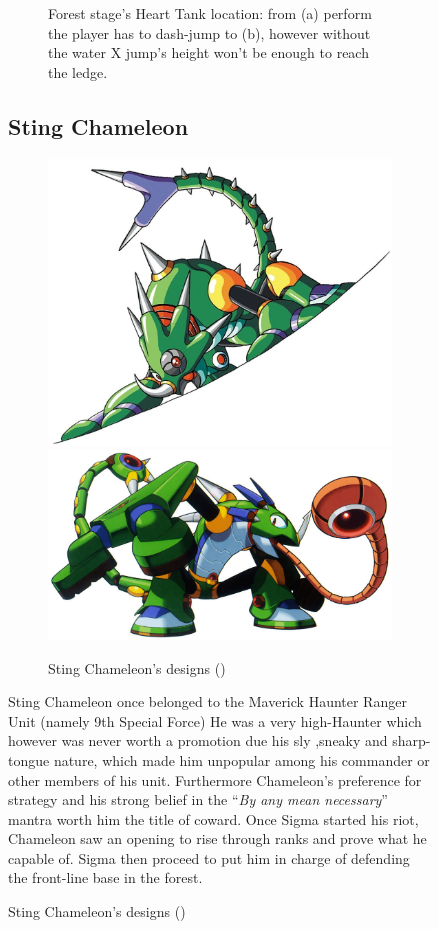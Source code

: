 \begin{figure}[htp]
\begin{figure}[htp]
\begin{subfigure}{0.45\linewidth}
		\caption{}
	\end{subfigure}
	\caption{Forest stage's Heart Tank location: from (a) perform the player has to dash-jump to (b), however without the water X jump's height won't be enough to reach the ledge.}
\end{figure}

\subsection{Sting Chameleon}\label{boss:Sting_chameleon}
\begin{figure}[htp]
	\centering
	\includegraphics[width=0.5\linewidth]{figures/X1/Sting_chameleon/Stingchameleon.jpg}
	\includegraphics[width=0.45\linewidth]{figures/X1/Sting_chameleon/MHXStingChameleon.jpg}
	\caption{Sting Chameleon's designs (\cite{book:MMX_Complete_art})}
\end{figure}
Sting Chameleon once belonged to the Maverick Haunter Ranger Unit (namely 9th Special Force\cite{wayback:X_resources}) He was a very high-Haunter which however was never worth a promotion due his sly ,sneaky and sharp-tongue nature, which made him unpopular\cite{Xcoll1:Manual_X1} among his commander or other members of his unit. Furthermore Chameleon's preference for strategy and his strong belief in the ``\textit{By any mean necessary}'' mantra  worth him the title of coward\cite{MHX:manual}. Once Sigma started his riot, Chameleon saw an opening to rise through ranks and prove what he capable of. Sigma then proceed to put him in charge of defending the front-line base in the forest.


\end{figure}

